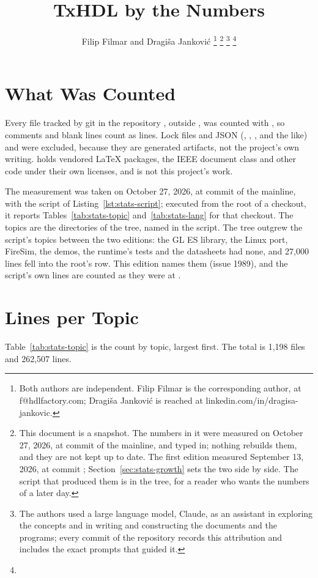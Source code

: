 \documentclass[journal,onecolumn,9pt]{IEEEtran}
\title{TxHDL by the Numbers}
\author{Filip Filmar and Dragiša Janković%
\thanks{Both authors are independent. Filip Filmar is the
corresponding author, at f@hdlfactory.com; Dragiša Janković is
reached at linkedin.com/in/dragisa-jankovic.}%
\thanks{This document is a snapshot. The numbers in it were measured
on October 27, 2026, at commit \code{489a2273} of the mainline, and
typed in; nothing rebuilds them, and they are not kept up to date.
The first edition measured September 13, 2026, at commit
\code{0ab36f3}; Section~\ref{sec:stats-growth} sets the two side by
side. The script that produced them is in the tree, for a reader who
wants the numbers of a later day.}%
\thanks{The authors used a large language model, Claude, as an
assistant in exploring the concepts and in writing and constructing
the documents and the programs; every commit of the repository records
this attribution and includes the exact prompts that guided it.}%
\thanks{\buildstamp}}
\begin{document}
\maketitle

\section{What Was Counted}

Every file tracked by git in the repository , outside
, was counted with , so comments and
blank lines count as lines. Lock files and JSON (,
, ,
 and the like) and  were
excluded, because they are generated artifacts, not the project's own
writing.  holds vendored \LaTeX{} packages, the IEEE
document class and other code under their own licenses, and is not this
project's work.

The measurement was taken on October 27, 2026, at commit
 of the mainline, with the script of
Listing~\ref{lst:stats-script}; executed from the root of a checkout,
it reports Tables~\ref{tab:stats-topic} and~\ref{tab:stats-lang} for
that checkout. The topics are the directories of the tree, named in
the script. The tree outgrew the script's topics between the two
editions: the GL ES library, the Linux port, FireSim, the demos, the
runtime's tests and the datasheets had none, and 27,000 lines fell into
the root's row. This edition names them (issue 1989), and the script's
own lines are counted as they were at .



\section{Lines per Topic}

Table~\ref{tab:stats-topic} is the count by topic, largest first.
The total is 1,198 files and 262,507 lines.
\end{document}
